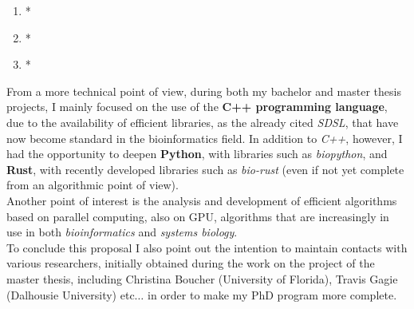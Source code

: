 \documentclass[a4paper,11pt, oneside]{article}
\begin{document}
\begin{enumerate}
  \item *
  \item *
  \item *
\end{enumerate}
From a more technical point of view, during both my bachelor and master
thesis projects, I mainly focused on the use of the \textbf{C++ programming 
  language},  due to the availability of efficient libraries, as the already
cited \textit{SDSL}, that have now become standard in the bioinformatics
field. In addition to \textit{C++}, however, I had the opportunity to deepen
\textbf{Python}, with libraries such as \textit{biopython}, and \textbf{Rust},
with recently developed libraries such as \textit{bio-rust} (even if not
yet complete from an algorithmic point of view). \\
Another point of interest is the analysis and development of efficient
algorithms based on parallel computing, also on GPU, algorithms that are
increasingly in use in both \textit{bioinformatics} and \textit{systems
  biology}. \\ 
To conclude this proposal I also point out the intention to maintain contacts
with various researchers, initially obtained during the work on the project of
the master thesis, including Christina Boucher (University of Florida), Travis
Gagie (Dalhousie University) etc$\ldots$ in order to make my PhD program more
complete. 


\newpage
\noindent
\end{document}
